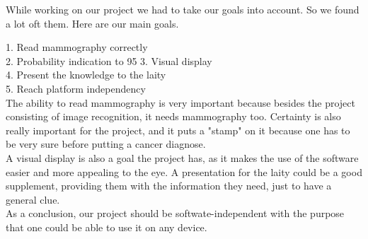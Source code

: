  While working on our project we had to take our goals into account. So we found a lot oft them.  Here are our main goals.

1.	Read mammography correctly\\
2.	Probability indication to 95%
3.	Visual display\\
4.	Present the knowledge to the laity\\
5.	Reach platform independency\\

The ability to read mammography is very important because besides the project consisting of image recognition, it needs mammography too. Certainty is also really important for the project, and it puts a "stamp" on it because one has to be very sure before putting a cancer diagnose.\\
 A visual display is also a goal the project has, as it makes the use of the software easier and more appealing to the eye. A presentation for the laity could be a good supplement, providing them with the information they need, just to have a general clue. \\
 As a conclusion, our project should be softwate-independent with the purpose that one could be able to use it on any device.
